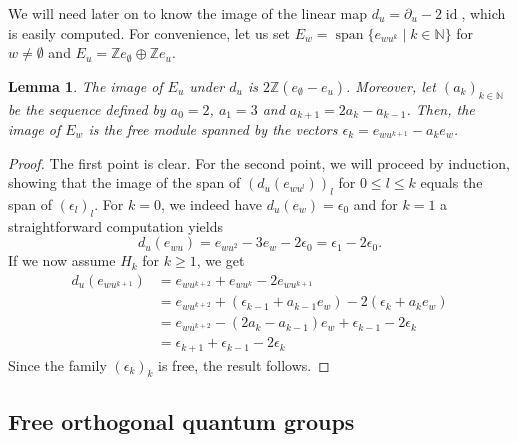 \documentclass[a4paper, 11pt]{amsart}
\theoremstyle{plain}
\newtheorem{lem}[thm]{Lemma}
\theoremstyle{definition}
\theoremstyle{remark}
\DeclareMathOperator{\id}{id}
\DeclareMathOperator{\Span}{span}
\newcommand{\N}{\mathbb{N}}
\newcommand{\Z}{\mathbb{Z}}
\begin{document}
We will need later on to know the image of the linear map $d_{u} = \partial_{u} - 2\id$, which is easily computed. For convenience, let us set $E_{w} = \Span\{e_{wu^{k}} \mid k\in \N\}$ for $w\neq\emptyset$ and $E_{u} = \Z e_{\emptyset}\oplus \Z e_{u}$.

\begin{lem}\label{lem:imagesu2}
The image of $E_{u}$ under $d_{u}$ is $2\Z(e_{\emptyset} - e_{u})$. Moreover, let $(a_{k})_{k\in \N}$ be the sequence defined by $a_{0} = 2$, $a_{1} = 3$ and $a_{k+1} = 2a_{k} - a_{k-1} $. Then, the image of $E_{w}$ is the free module spanned by the vectors $\epsilon_{k} = e_{wu^{k+1}} - a_{k}e_{w}$.
\end{lem}

\begin{proof}
The first point is clear. For the second point, we will proceed by induction, showing that the image of the span of $(d_{u}(e_{wu^{l}}))_{l}$ for $0\leqslant l\leqslant k$ equals the span of $(\epsilon_{l})_{l}$. For $k=0$, we indeed have $d_{u}(e_{w}) = \epsilon_{0}$ and for $k = 1$ a straightforward computation yields 
\begin{equation*}
d_{u}(e_{wu}) = e_{wu^{2}} - 3e_{w} - 2\epsilon_{0} = \epsilon_{1} - 2\epsilon_{0}.
\end{equation*}
If we now assume $H_{k}$ for $k\geqslant 1$, we get
\begin{align*}
d_{u}(e_{wu^{k+1}}) & = e_{wu^{k+2}} + e_{wu^{k}} - 2e_{wu^{k+1}} \\
& = e_{wu^{k+2}} + (\epsilon_{k-1} + a_{k-1}e_{w}) - 2(\epsilon_{k} + a_{k}e_{w}) \\
& = e_{wu^{k+2}} - (2a_{k} - a_{k-1})e_{w} + \epsilon_{k-1} - 2\epsilon_{k} \\
& = \epsilon_{k+1} + \epsilon_{k-1} - 2\epsilon_{k}
\end{align*}
Since the family $(\epsilon_{k})_{k}$ is free, the result follows.
\end{proof}

\subsection{Free orthogonal quantum groups}
\end{document}
